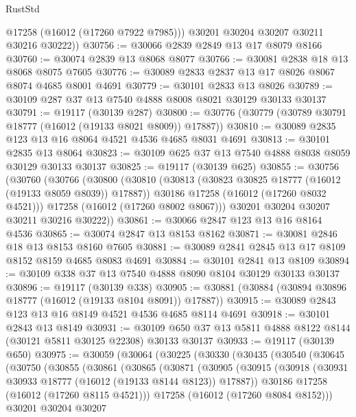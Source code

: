 \begin{lexlean}{RustStd}
\begin{coremodule}
          @17258
          (@16012 (@17260 @7922 @7985)))
        @30201
        @30204
        @30207
        @30211
        @30216
        @30222))
@30756 := @30066 @2839 @2849 @13 @17 @8079 @8166
@30760 := @30074 @2839 @13 @8068 @8077
@30766 := @30081 @2838 @18 @13 @8068 @8075 @7605
@30776 := @30089 @2833 @2837 @13 @17 @8026 @8067 @8074 @4685 @8001 @4691
@30779 := @30101 @2833 @13 @8026
@30789 := @30109 @287 @37 @13 @7540 @4888 @8008 @8021 @30129 @30133 @30137
@30791 := @19117 (@30139 @287)
@30800 := @30776 (@30779 (@30789 @30791 @18777 (@16012 (@19133 @8021 @8009)) @17887))
@30810 := @30089 @2835 @123 @13 @16 @8064 @4521 @4536 @4685 @8031 @4691
@30813 := @30101 @2835 @13 @8064
@30823 := @30109 @625 @37 @13 @7540 @4888 @8038 @8059 @30129 @30133 @30137
@30825 := @19117 (@30139 @625)
@30855 := @30756
    (@30760
      (@30766
        (@30800
          (@30810
            (@30813 (@30823 @30825 @18777 (@16012 (@19133 @8059 @8039)) @17887))
            @30186
            @17258
            (@16012 (@17260 @8032 @4521)))
          @17258
          (@16012 (@17260 @8002 @8067)))
        @30201
        @30204
        @30207
        @30211
        @30216
        @30222))
@30861 := @30066 @2847 @123 @13 @16 @8164 @4536
@30865 := @30074 @2847 @13 @8153 @8162
@30871 := @30081 @2846 @18 @13 @8153 @8160 @7605
@30881 := @30089 @2841 @2845 @13 @17 @8109 @8152 @8159 @4685 @8083 @4691
@30884 := @30101 @2841 @13 @8109
@30894 := @30109 @338 @37 @13 @7540 @4888 @8090 @8104 @30129 @30133 @30137
@30896 := @19117 (@30139 @338)
@30905 := @30881 (@30884 (@30894 @30896 @18777 (@16012 (@19133 @8104 @8091)) @17887))
@30915 := @30089 @2843 @123 @13 @16 @8149 @4521 @4536 @4685 @8114 @4691
@30918 := @30101 @2843 @13 @8149
@30931 := @30109 @650 @37 @13 @5811 @4888 @8122 @8144 (@30121 @5811 @30125 @22308) @30133 @30137
@30933 := @19117 (@30139 @650)
@30975 := @30059
    (@30064
      (@30225
        (@30330
          (@30435
            (@30540
              (@30645
                (@30750
                  (@30855
                    (@30861
                      (@30865
                        (@30871
                          (@30905
                            (@30915
                              (@30918 (@30931 @30933 @18777 (@16012 (@19133 @8144 @8123)) @17887))
                              @30186
                              @17258
                              (@16012 (@17260 @8115 @4521)))
                            @17258
                            (@16012 (@17260 @8084 @8152)))
                          @30201
                          @30204
                          @30207

\end{coremodule}
\end{lexlean}
